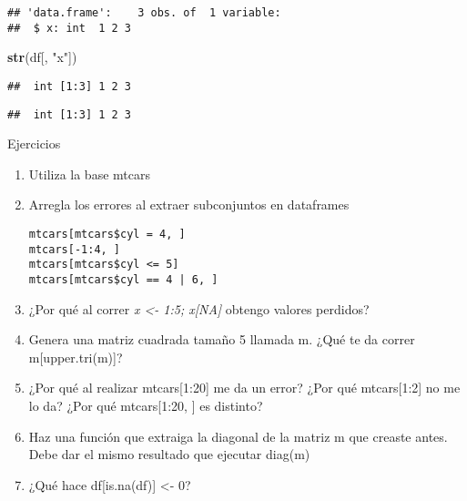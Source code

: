 \documentclass[]{article}
\newenvironment{Shaded}{\begin{snugshade}}{\end{snugshade}}
\newcommand{\KeywordTok}[1]{\textcolor[rgb]{0.13,0.29,0.53}{\textbf{{#1}}}}
\newcommand{\StringTok}[1]{\textcolor[rgb]{0.31,0.60,0.02}{{#1}}}
\newcommand{\NormalTok}[1]{{#1}}
\begin{document}
\begin{verbatim}
## 'data.frame':    3 obs. of  1 variable:
##  $ x: int  1 2 3
\end{verbatim}

\begin{Shaded}
\begin{Highlighting}[]
\KeywordTok{str}\NormalTok{(df[, }\StringTok{"x"}\NormalTok{])}
\end{Highlighting}
\end{Shaded}

\begin{verbatim}
##  int [1:3] 1 2 3
\end{verbatim}

\begin{Shaded}
\end{Shaded}

\begin{verbatim}
##  int [1:3] 1 2 3
\end{verbatim}

\renewcommand\bcStyleTitre[1]{\large\textcolor{bbblack}{#1}}

\begin{bclogo}[
  couleur=llred,
  arrondi=0,
  logo=\bcstop,
  barre=none,
  noborder=true]{Ejercicios}
\begin{enumerate}
\item Utiliza la base mtcars
\item{Arregla los errores al extraer subconjuntos en dataframes
\begin{verbatim}
mtcars[mtcars$cyl = 4, ]
mtcars[-1:4, ]
mtcars[mtcars$cyl <= 5]
mtcars[mtcars$cyl == 4 | 6, ]
\end{verbatim}
}
\item ¿Por qué al correr {\it x <- 1:5; x[NA] } obtengo valores perdidos?
\item Genera una matriz cuadrada tamaño 5 llamada m. ¿Qué te da correr m[upper.tri(m)]?
\item ¿Por qué al realizar mtcars[1:20] me da un error? ¿Por qué mtcars[1:2] no me lo da?
¿Por qué mtcars[1:20, ] es distinto?
\item Haz una función que extraiga la diagonal de la matriz m que creaste antes.
Debe dar el mismo resultado que ejecutar diag(m)
\item ¿Qué hace df[is.na(df)] <- 0?
\end{enumerate}
\end{bclogo}
\end{document}
